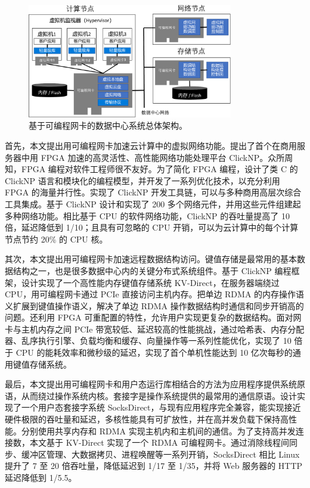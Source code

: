\begin{figure}[htbp]
	\centering
	\includegraphics[width=0.8\textwidth]{figures/accel_arch.pdf}
	\caption{基于可编程网卡的数据中心系统总体架构。}
	\label{intro:fig:accel-arch}
\end{figure}

首先，本文提出用可编程网卡加速云计算中的虚拟网络功能。提出了首个在商用服务器中用 FPGA 加速的高灵活性、高性能网络功能处理平台 ClickNP。众所周知，FPGA 编程对软件工程师很不友好。为了简化 FPGA 编程，设计了类 C 的 ClickNP 语言和模块化的编程模型，并开发了一系列优化技术，以充分利用 FPGA 的海量并行性。实现了 ClickNP 开发工具链，可以与多种商用高层次综合工具集成。基于 ClickNP 设计和实现了 200 多个网络元件，并用这些元件组建起多种网络功能。相比基于 CPU 的软件网络功能，ClickNP 的吞吐量提高了 10 倍，延迟降低到 1/10；且具有可忽略的 CPU 开销，可以为云计算中的每个计算节点节约 20\% 的 CPU 核。

其次，本文提出用可编程网卡加速远程数据结构访问。键值存储是最常用的基本数据结构之一，也是很多数据中心内的关键分布式系统组件。基于 ClickNP 编程框架，设计实现了一个高性能内存键值存储系统 KV-Direct，在服务器端绕过 CPU，用可编程网卡通过 PCIe 直接访问主机内存。把单边 RDMA 的内存操作语义扩展到键值操作语义，解决了单边 RDMA 操作数据结构时通信和同步开销高的问题。还利用 FPGA 可重配置的特性，允许用户实现更复杂的数据结构。面对网卡与主机内存之间 PCIe 带宽较低、延迟较高的性能挑战，通过哈希表、内存分配器、乱序执行引擎、负载均衡和缓存、向量操作等一系列性能优化，实现了 10 倍于 CPU 的能耗效率和微秒级的延迟，实现了首个单机性能达到 10 亿次每秒的通用键值存储系统。

最后，本文提出用可编程网卡和用户态运行库相结合的方法为应用程序提供系统原语，从而绕过操作系统内核。套接字是操作系统提供的最常用的通信原语。设计实现了一个用户态套接字系统 SocksDirect，与现有应用程序完全兼容，能实现接近硬件极限的吞吐量和延迟，多核性能具有可扩放性，并在高并发负载下保持高性能。分别使用共享内存和 RDMA 实现主机内和主机间的通信。为了支持高并发连接数，本文基于 KV-Direct 实现了一个 RDMA 可编程网卡。通过消除线程间同步、缓冲区管理、大数据拷贝、进程唤醒等一系列开销，SocksDirect 相比 Linux 提升了 7 至 20 倍吞吐量，降低延迟到 1/17 至 1/35，并将 Web 服务器的 HTTP 延迟降低到 1/5.5。


